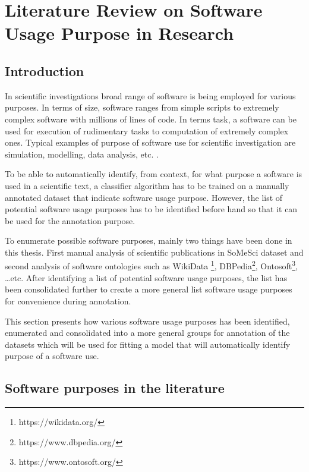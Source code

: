 \chapter{Literature Review on Software Usage Purpose in Research }
\label{ch:chapter03}
 

%
%
\section{Introduction}
\label{sec:chapter03:intro}
In scientific investigations broad range of software is being employed for various purposes. In terms of size, software ranges from simple scripts to extremely complex software with millions of lines of code. In terms task, a software can be used for execution of rudimentary tasks to computation of extremely complex ones. Typical examples of purpose of software use for scientific investigation are simulation, modelling, data analysis, etc. \citep{goble2014better}.  

To be able to automatically identify, from context, for what purpose a software is used in a scientific text, a classifier algorithm has to be trained on a manually annotated dataset that indicate software usage purpose. However, the list of potential software usage purposes has to be identified before hand so that it can be used for the annotation purpose. 

To enumerate possible software purposes, mainly two things have been done in this thesis. First manual analysis of scientific publications in SoMeSci dataset and second  analysis of software ontologies such as WikiData \footnote{https://wikidata.org/}, DBPedia\footnote{https://www.dbpedia.org/}, Ontosoft\footnote{https://www.ontosoft.org/}, …etc. After identifying a list of potential software usage purposes, the list has been consolidated further to create a more general list software usage purposes for convenience during annotation.  

This section presents how various software usage purposes has been identified, enumerated and consolidated into a more general groups for annotation of the datasets which will be used for fitting a model that will automatically identify purpose of a software use. 

\section{Software purposes in the literature }


